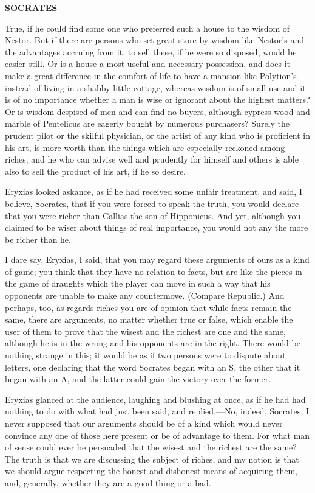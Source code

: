 \documentclass[11pt,letter]{article}
\begin{document}
\par \textbf{SOCRATES}
\par   True, if he could find some one who preferred such a house to the wisdom of Nestor. But if there are persons who set great store by wisdom like Nestor's and the advantages accruing from it, to sell these, if he were so disposed, would be easier still. Or is a house a most useful and necessary possession, and does it make a great difference in the comfort of life to have a mansion like Polytion's instead of living in a shabby little cottage, whereas wisdom is of small use and it is of no importance whether a man is wise or ignorant about the highest matters? Or is wisdom despised of men and can find no buyers, although cypress wood and marble of Pentelicus are eagerly bought by numerous purchasers? Surely the prudent pilot or the skilful physician, or the artist of any kind who is proficient in his art, is more worth than the things which are especially reckoned among riches; and he who can advise well and prudently for himself and others is able also to sell the product of his art, if he so desire.

\par  Eryxias looked askance, as if he had received some unfair treatment, and said, I believe, Socrates, that if you were forced to speak the truth, you would declare that you were richer than Callias the son of Hipponicus. And yet, although you claimed to be wiser about things of real importance, you would not any the more be richer than he.

\par  I dare say, Eryxias, I said, that you may regard these arguments of ours as a kind of game; you think that they have no relation to facts, but are like the pieces in the game of draughts which the player can move in such a way that his opponents are unable to make any countermove. (Compare Republic.) And perhaps, too, as regards riches you are of opinion that while facts remain the same, there are arguments, no matter whether true or false, which enable the user of them to prove that the wisest and the richest are one and the same, although he is in the wrong and his opponents are in the right. There would be nothing strange in this; it would be as if two persons were to dispute about letters, one declaring that the word Socrates began with an S, the other that it began with an A, and the latter could gain the victory over the former.

\par  Eryxias glanced at the audience, laughing and blushing at once, as if he had had nothing to do with what had just been said, and replied,—No, indeed, Socrates, I never supposed that our arguments should be of a kind which would never convince any one of those here present or be of advantage to them. For what man of sense could ever be persuaded that the wisest and the richest are the same? The truth is that we are discussing the subject of riches, and my notion is that we should argue respecting the honest and dishonest means of acquiring them, and, generally, whether they are a good thing or a bad.
\end{document}
